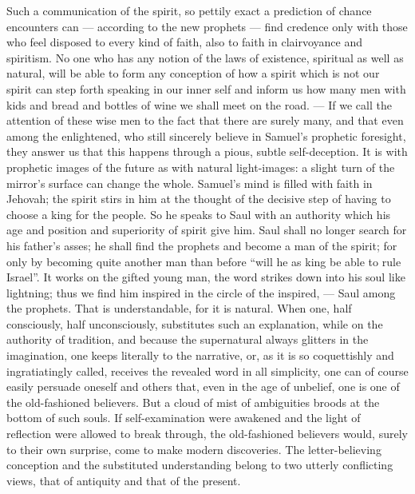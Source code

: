 \documentclass[12pt,a4paper,openany]{book}
\newcommand{\opage}[1]{\marginnote{\footnotesize\textit{[#1]}}}
\begin{document}
Such a communication of the spirit, so pettily exact a
prediction of chance encounters can --- according to
the new prophets --- find credence only with those who
feel disposed to every kind of faith, also to faith in
clairvoyance and spiritism. No one who has any
notion of the laws of existence, spiritual as well as
natural, will be able to form any conception of
how a spirit which is not our spirit can step forth
speaking in our inner self and inform us how many
men with kids and bread and bottles of wine we shall
meet on the road. --- If we call the attention of these wise men
to the fact that there are surely many, and that even
among the enlightened, who still sincerely believe in Samuel's
prophetic foresight, they answer us that this happens through
a pious, subtle self-deception. It is with prophetic
images of the future as with natural light-images:
a slight turn of the mirror's surface can change the whole.
Samuel's mind is filled with faith in Jehovah; the spirit
stirs in him at the thought of the decisive step
of having to choose a king for the people. So he speaks to
Saul with an authority which his age and position
and superiority of spirit give him. Saul shall no longer
search for his father's asses; he shall find the prophets
and become a man of the spirit; for only by becoming
quite another man than before ``will he as king be able to
rule Israel''. It works on the gifted young man,
the word strikes down into his soul like lightning; thus we find
him inspired in the circle of the inspired, --- Saul among
the prophets. That is understandable, for it is natural.
When one, half consciously, half unconsciously, substitutes
\setcounter{footnote}{0}%
\opage{11}such an explanation, while on the authority of tradition,
and because the supernatural always glitters in
the imagination, one keeps literally to the narrative, or,
as it is so coquettishly and ingratiatingly called, receives the
revealed word in all simplicity, one can of course easily
persuade oneself and others that, even in the age of unbelief,
one is one of the old-fashioned believers. But a cloud of mist
of ambiguities broods at the bottom of such
souls. If self-examination were awakened and the light of
reflection were allowed to break through, the old-fashioned
believers would, surely to their own surprise,
come to make modern discoveries. The letter-believing
conception and the substituted understanding belong
to two utterly conflicting views, that of antiquity and that of
the present.
\end{document}
